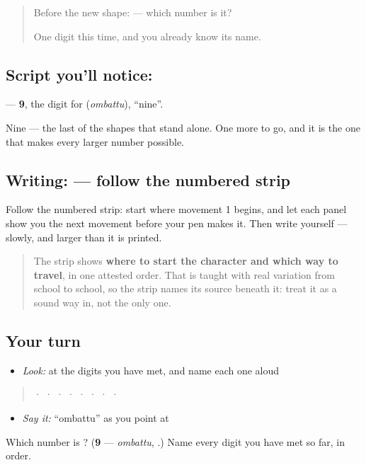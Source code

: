 \label{lesson:KA-S148-digit-nine}



\begin{quote}
Before the new shape: \textbf{} — which number is it?

One digit this time, and you already know its name.
\end{quote}

\subsection*{Script you'll notice: }
\textbf{} — \textbf{9}, the digit for \textbf{} (\emph{ombattu}), \textquotedblleft{}nine\textquotedblright{}.

Nine — the last of the shapes that stand alone. One more to go, and it is the one that makes every larger number possible.

\subsection*{Writing:  — follow the numbered strip}

Follow the numbered strip: start where movement 1 begins, and let each panel show you the next movement before your pen makes it. Then write  yourself — slowly, and larger than it is printed.

\begin{quote}
The strip shows \textbf{where to start the character and which way to travel}, in one attested order. That is taught with real variation from school to school, so the strip names its source beneath it: treat it as a sound way in, not the only one.
\end{quote}

\subsection*{Your turn}
\begin{itemize}
\raggedright
  \item \emph{Look:} at the digits you have met, and name each one aloud
\end{itemize}

\begin{quote}
  ·    ·    ·    ·    ·    ·    ·    ·  
\end{quote}

\begin{itemize}
\raggedright
  \item \emph{Say it:} \textquotedblleft{}ombattu\textquotedblright{} as you point at 
\end{itemize}

\begin{tcolorbox}[breakable,colback=teal!4,colframe=teal!35!black,title={Before you move on}]
Which number is \textbf{}? (\textbf{9} — \emph{ombattu}, .) Name every digit you have met so far, in order.
\end{tcolorbox}
